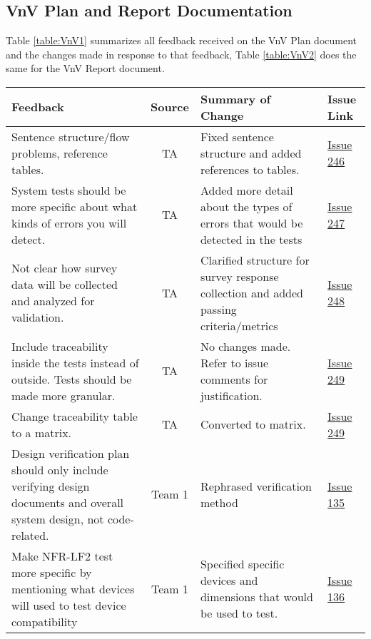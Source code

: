 \documentclass{article}
\begin{document}
\subsection{VnV Plan and Report Documentation}
Table \ref{table:VnV1} summarizes all feedback received on the VnV Plan document
and the changes made in response to that feedback, Table \ref{table:VnV2} does
the same for the VnV Report document.
\begin{table}[H]
\centering
\begin{tabularx}{\textwidth}{|X|c|X|p{1.5cm}|}
    \hline
    \textbf{Feedback} & \textbf{Source} & \textbf{Summary of Change} &
    \textbf{Issue Link} \\
    \hline
    Sentence structure/flow problems, reference tables. & TA & Fixed sentence
    structure and added references to tables. &
    \href{https://github.com/SumanyaG/Alkalytics/issues/246}{Issue 246} \\
    \hline
    System tests should be more specific about what kinds of errors you will
    detect. & TA & Added more detail about the types of errors that would be
    detected in the tests &
    \href{https://github.com/SumanyaG/Alkalytics/issues/247}{Issue 247} \\
    \hline
    Not clear how survey data will be collected and analyzed for validation. &
    TA & Clarified structure for survey response collection and added passing
    criteria/metrics &
    \href{https://github.com/SumanyaG/Alkalytics/issues/248}{Issue 248} \\
    \hline
    Include traceability inside the tests instead of outside. Tests should be
    made more granular. & TA & No changes made. Refer to issue comments for
    justification. &
    \href{https://github.com/SumanyaG/Alkalytics/issues/249}{Issue 249} \\
    \hline
    Change traceability table to a matrix. & TA & Converted to matrix. &
    \href{https://github.com/SumanyaG/Alkalytics/issues/249}{Issue 249} \\
    \hline
    Design verification plan should only include verifying design documents and
    overall system design, not code-related. & Team 1 & Rephrased verification
    method & \href{https://github.com/SumanyaG/Alkalytics/issues/135}{Issue 135}
    \\
    \hline
    Make NFR-LF2 test more specific by mentioning what devices will used to test
    device compatibility & Team 1 & Specified specific devices and dimensions
    that would be used to test. &
    \href{https://github.com/SumanyaG/Alkalytics/issues/136}{Issue 136} \\

\end{tabularx}
\end{table}
\end{document}
